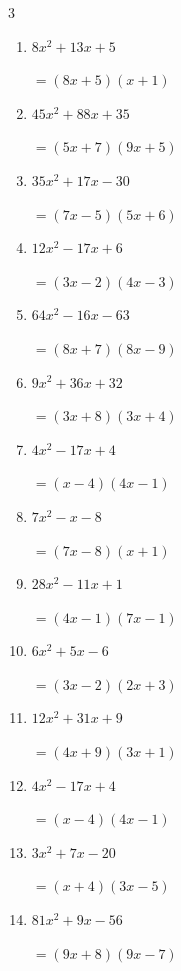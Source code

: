 \begin{multicols}{3}
\begin{enumerate}
        $=(9x-2)(6x-7)$

\columnbreak %

\resetques

  \item $8x^{2}+13x+5$

        $=(8x+5)(x+1)$

  \item $45x^{2}+88x+35$

        $=(5x+7)(9x+5)$

  \item $35x^{2}+17x-30$

        $=(7x-5)(5x+6)$

  \item $12x^{2}-17x+6$

        $=(3x-2)(4x-3)$

  \item $64x^{2}-16x-63$

        $=(8x+7)(8x-9)$

  \item $9x^{2}+36x+32$

        $=(3x+8)(3x+4)$

  \item $4x^{2}-17x+4$

        $=(x-4)(4x-1)$

  \item $7x^{2}-x-8$

        $=(7x-8)(x+1)$

  \item $28x^{2}-11x+1$

        $=(4x-1)(7x-1)$

  \item $6x^{2}+5x-6$

        $=(3x-2)(2x+3)$

\columnbreak %

  \item $12x^{2}+31x+9$

        $=(4x+9)(3x+1)$

  \item $4x^{2}-17x+4$

        $=(x-4)(4x-1)$

  \item $3x^{2}+7x-20$

        $=(x+4)(3x-5)$

  \item $81x^{2}+9x-56$

        $=(9x+8)(9x-7)$


\end{enumerate}
\end{multicols}

